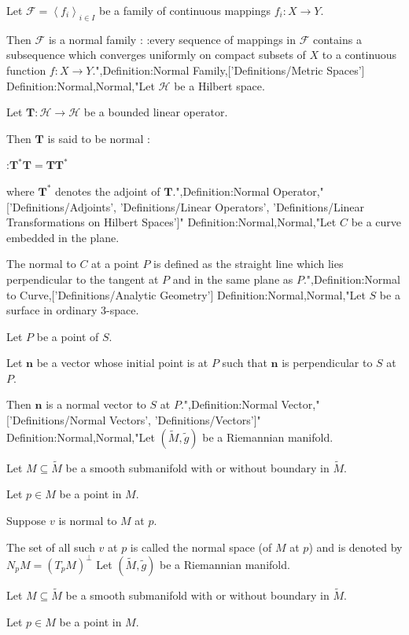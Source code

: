 Let $\mathcal F = \left\langle f_i \right\rangle_{i \mathop \in I}$ be a family of continuous mappings $f_i: X \to Y$.


Then $\mathcal F$ is a normal family :
:every sequence of mappings in $\mathcal F$ contains a subsequence which converges uniformly on compact subsets of $X$ to a continuous function $f: X \to Y$.",Definition:Normal Family,['Definitions/Metric Spaces']
Definition:Normal,Normal,"Let $\mathcal H$ be a Hilbert space.

Let $\mathbf T: \mathcal H \to \mathcal H$ be a bounded linear operator.


Then $\mathbf T$ is said to be normal :

:$\mathbf T^* \mathbf T = \mathbf T \mathbf T^*$

where $\mathbf T^*$ denotes the adjoint of $\mathbf T$.",Definition:Normal Operator,"['Definitions/Adjoints', 'Definitions/Linear Operators', 'Definitions/Linear Transformations on Hilbert Spaces']"
Definition:Normal,Normal,"Let $C$ be a curve embedded in the plane.

The normal to $C$ at a point $P$ is defined as the straight line which lies perpendicular to the tangent at $P$ and in the same plane as $P$.",Definition:Normal to Curve,['Definitions/Analytic Geometry']
Definition:Normal,Normal,"Let $S$ be a surface in ordinary $3$-space.

Let $P$ be a point of $S$.


Let $\mathbf n$ be a vector whose initial point is at $P$ such that $\mathbf n$ is perpendicular to $S$ at $P$.


Then $\mathbf n$ is a normal vector to $S$ at $P$.",Definition:Normal Vector,"['Definitions/Normal Vectors', 'Definitions/Vectors']"
Definition:Normal,Normal,"Let $\left( \tilde M, \tilde g \right)$ be a Riemannian manifold.

Let $M \subseteq \tilde M$ be a smooth submanifold with or without boundary in $\tilde M$.

Let $p \in M$ be a point in $M$.

Suppose $v$ is normal to $M$ at $p$.


The set of all such $v$ at $p$ is called the normal space (of $M$ at $p$) and is denoted by $N_p M = \left( T_p M \right)^\perp$
Let $\left( \tilde M, \tilde g \right)$ be a Riemannian manifold.

Let $M \subseteq \tilde M$ be a smooth submanifold with or without boundary in $\tilde M$.

Let $p \in M$ be a point in $M$.

